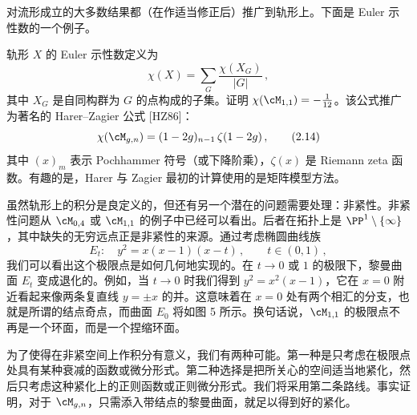 对流形成立的大多数结果都（在作适当修正后）推广到轨形上。下面是 Euler 示性数的一个例子。

\begin{exercise}[2.3]
  轨形 $X$ 的 Euler 示性数定义为
  \begin{equation}
    \chi(X)=\sum_{G}\frac{\chi(X_G)}{|G|}\,,
    \tag{2.13}
  \end{equation}
  其中 $X_G$ 是自同构群为 $G$ 的点构成的子集。证明 $\chi(\cM_{1,1})=-\frac{1}{12}$。该公式推广为著名的 Harer–Zagier 公式 [HZ86]：
  \begin{equation}
    \chi(\cM_{g,n})=(1-2g)_{n-1}\,\zeta(1-2g)\,,
    \tag{2.14}
  \end{equation}
  其中 $(x)_m$ 表示 Pochhammer 符号（或下降阶乘），$\zeta(x)$ 是 Riemann zeta 函数。有趣的是，Harer 与 Zagier 最初的计算使用的是矩阵模型方法。
\end{exercise}

虽然轨形上的积分是良定义的，但还有另一个潜在的问题需要处理：非紧性。非紧性问题从 $\cM_{0,4}$ 或 $\cM_{1,1}$ 的例子中已经可以看出。后者在拓扑上是 $\PP^1\setminus\{\infty\}$，其中缺失的无穷远点正是非紧性的来源。通过考虑椭圆曲线族
\begin{equation}
  E_t:\quad y^2=x(x-1)(x-t)\,,\qquad t\in(0,1)\,,
  \tag{2.15}
\end{equation}
我们可以看出这个极限点是如何几何地实现的。在 $t\to 0$ 或 $1$ 的极限下，黎曼曲面 $E_t$ 变成退化的。例如，当 $t\to 0$ 时我们得到 $y^2=x^2(x-1)$，它在 $x=0$ 附近看起来像两条复直线 $y=\pm x$ 的并。这意味着在 $x=0$ 处有两个相汇的分支，也就是所谓的结点奇点，而曲面 $E_0$ 将如图 5 所示。换句话说，$\cM_{1,1}$ 的极限点不再是一个环面，而是一个捏缩环面。


为了使得在非紧空间上作积分有意义，我们有两种可能。第一种是只考虑在极限点处具有某种衰减的函数或微分形式。第二种选择是把所关心的空间适当地紧化，然后只考虑这种紧化上的正则函数或正则微分形式。我们将采用第二条路线。事实证明，对于 $\cM_{g,n}$，只需添入带结点的黎曼曲面，就足以得到好的紧化。

